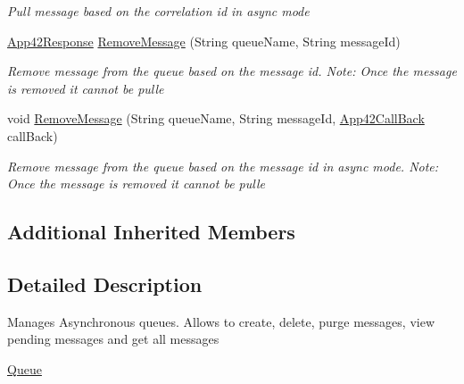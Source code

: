 \begin{DoxyCompactItemize}
\begin{DoxyCompactList}\small\item\em Pull message based on the correlation id in async mode \end{DoxyCompactList}\item 
\hyperlink{classcom_1_1shephertz_1_1app42_1_1paas_1_1sdk_1_1csharp_1_1_app42_response}{App42\+Response} \hyperlink{classcom_1_1shephertz_1_1app42_1_1paas_1_1sdk_1_1csharp_1_1message_1_1_queue_service_ab07bc58054082dce4ef97eced90a55e6}{Remove\+Message} (String queue\+Name, String message\+Id)
\begin{DoxyCompactList}\small\item\em Remove message from the queue based on the message id. Note\+: Once the message is removed it cannot be pulle \end{DoxyCompactList}\item 
void \hyperlink{classcom_1_1shephertz_1_1app42_1_1paas_1_1sdk_1_1csharp_1_1message_1_1_queue_service_ab6f4576c55c66acbaf8d1ec1a6cad855}{Remove\+Message} (String queue\+Name, String message\+Id, \hyperlink{interfacecom_1_1shephertz_1_1app42_1_1paas_1_1sdk_1_1csharp_1_1_app42_call_back}{App42\+Call\+Back} call\+Back)
\begin{DoxyCompactList}\small\item\em Remove message from the queue based on the message id in async mode. Note\+: Once the message is removed it cannot be pulle \end{DoxyCompactList}\end{DoxyCompactItemize}
\subsection*{Additional Inherited Members}


\subsection{Detailed Description}
Manages Asynchronous queues. Allows to create, delete, purge messages, view pending messages and get all messages 

\hyperlink{classcom_1_1shephertz_1_1app42_1_1paas_1_1sdk_1_1csharp_1_1message_1_1_queue_service}{Queue} 

